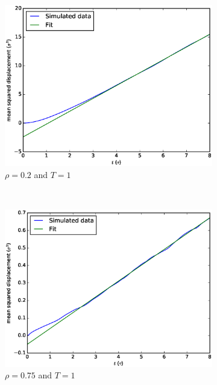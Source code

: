 \documentclass[twoside]{article}
\begin{document}
\begin{figure}[h]
	\begin{subfigure}[b]{0.48\textwidth}
	\centering
	\includegraphics[width=0.9\linewidth]{fig/figure_msd_gas.eps}
	\caption{$\rho = 0.2$ and $T = 1$}
	\label{fig:figure_msd_gas}
	\end{subfigure}
	~
	\begin{subfigure}[b]{0.48\textwidth}
		\centering
		\includegraphics[width=0.9\linewidth]{fig/figure_msd_liquid.eps}
		\caption{$\rho = 0.75$ and $T = 1$}
		\label{fig:figure_msd_liquid}
	\end{subfigure}
	\\
	\begin{subfigure}[b]{0.48\textwidth}
		\centering

\end{subfigure}
\end{figure}
\end{document}
